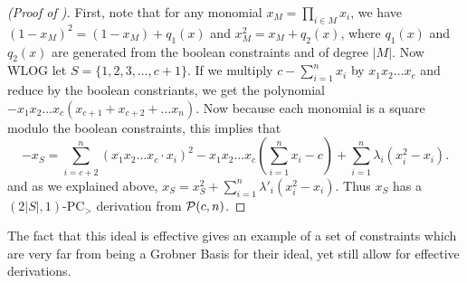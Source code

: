 \begin{proof}[(Proof of )]
First, note that for any monomial $x_M = \prod_{i \in M} x_i$, we have $(1-x_M)^2 = (1-x_M) + q_1(x)$ and $x_M^2 = x_M + q_2(x)$, where $q_1(x)$ and $q_2(x)$ are generated from the boolean constraints and of degree $|M|$. Now WLOG let $S = \{1,2,3,\dots,c+1\}$. If we multiply $c - \sum_{i=1}^n x_i$ by $x_1x_2\dots x_c$ and reduce by the boolean constriants, we get the polynomial $-x_1x_2\dots x_c(x_{c+1} + x_{c+2} + \dots x_n)$. Now because each monomial is a square modulo the boolean constraints, this implies that 
\[-x_S = \sum_{i = c+2}^n (x_1x_2\dots x_c \cdot x_i)^2 - x_1x_2\dots x_c(\sum_{i=1}^n x_i - c) + \sum_{i=1}^n \lambda_i(x_i^2 - x_i).\]
and as we explained above, $x_S = x_S^2 + \sum_{i=1}^n \lambda'_i(x_i^2 - x_i)$. Thus $x_S$ has a $(2|S|,1)$-PC$_>$ derivation from $\mathcal P(c,n)$.
\end{proof}

The fact that this ideal is effective gives an example of a set of constraints which are very far from being a Grobner Basis for their ideal, yet still allow for effective derivations. 


